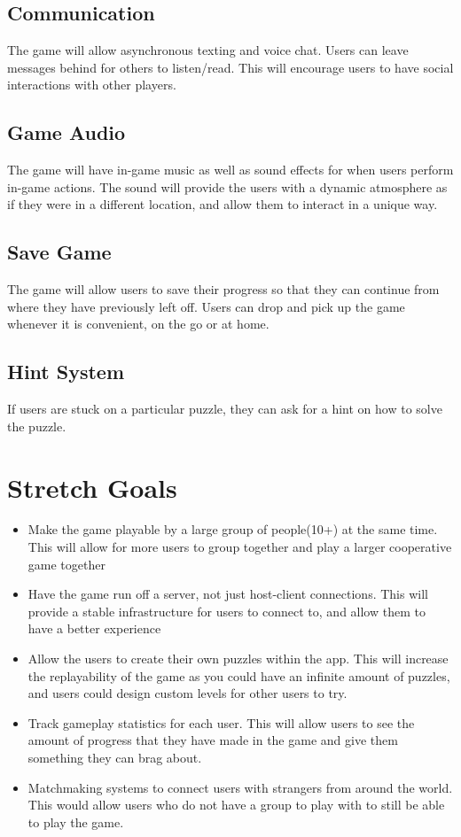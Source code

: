 \documentclass{article}
\begin{document}
\subsection{Communication}
The game will allow asynchronous texting and voice chat. Users can leave messages behind for others to listen/read. This will encourage users to have social interactions with other players.
\subsection{Game Audio}
The game will have in-game music as well as sound effects for when users perform in-game actions. The sound will provide the users with a dynamic atmosphere as if they were in a different location, and allow them to interact in a unique way. 
\subsection{Save Game}
The game will allow users to save their progress so that they can continue from where they have previously left off. Users can drop and pick up the game whenever it is convenient, on the go or at home. 
\subsection{Hint System}
If users are stuck on a particular puzzle, they can ask for a hint on how to solve the puzzle. 
\section{Stretch Goals}
\begin{itemize}
    \item Make the game playable by a large group of people(10+) at the same time. This will allow for more users to group together and play a larger cooperative game together
    \item Have the game run off a server, not just host-client connections. This will provide a stable infrastructure for users to connect to, and allow them to have a better experience
    \item Allow the users to create their own puzzles within the app. This will increase the replayability of the game as you could have an infinite amount of puzzles, and users could design custom levels for other users to try.
    \item Track gameplay statistics for each user. This will allow users to see the amount of progress that they have made in the game and give them something they can brag about.
    \item Matchmaking systems to connect users with strangers from around the world. This would allow users who do not have a group to play with to still be able to play the game.
\end{itemize}
\end{document}
